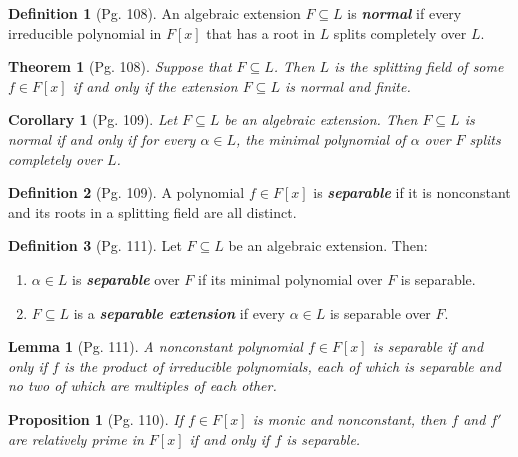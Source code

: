 \documentclass[leqno]{article}
\newtheorem{theorem}{Theorem}
\newtheorem{corollary}{Corollary}
\newtheorem{lemma}{Lemma}
\theoremstyle{definition}
\newtheorem{prop}{Proposition}
\newtheorem{definition}{Definition}
\theoremstyle{remark}
\theoremstyle{definition}
\begin{document}
    \begin{definition}[Pg. 108]\label{def:7}
        An algebraic extension $F\subseteq L$ is \textbf{\textit{normal}} if every irreducible polynomial in $F[x]$ that has a root in $L$ splits completely over $L$.
    \end{definition}
    \begin{theorem}[Pg. 108]\label{thm:5}
        Suppose that $F\subseteq L$. Then $L$ is the splitting field of some $f\in F[x]$ if and only if the extension $F\subseteq L$ is normal and finite.
    \end{theorem}
    \begin{corollary}[Pg. 109]\label{cor:2}
        Let $F\subseteq L$ be an algebraic extension. Then $F\subseteq L$ is normal if and only if for every $\alpha\in L$, the minimal polynomial of $\alpha$ over $F$ splits completely over $L$.
    \end{corollary}
    \begin{definition}[Pg. 109]\label{def:8}
        A polynomial $f\in F[x]$ is \textbf{\textit{separable}} if it is nonconstant and its roots in a splitting field are all distinct.
    \end{definition}
    \begin{definition}[Pg. 111]\label{def:9}
        Let $F\subseteq L$ be an algebraic extension. Then:
            \begin{enumerate}[label=\normalfont{(\alph*)}]
                \item $\alpha\in L$ is \textbf{\textit{separable}} over $F$ if its minimal polynomial over $F$ is separable.
                \item $F\subseteq L$ is a \textbf{\textit{separable extension}} if every $\alpha\in L$ is separable over $F$.
            \end{enumerate}
    \end{definition}
    \begin{lemma}[Pg. 111]\label{lem:10}
        A nonconstant polynomial $f\in F[x]$ is separable if and only if $f$ is the product of irreducible polynomials, each of which is separable and no two of which are multiples of each other. 
    \end{lemma}
    \begin{prop}[Pg. 110]\label{prop:3}
        \textit{If $f\in F[x]$ is monic and nonconstant, then $f$ and $f'$ are relatively prime in $F[x]$ if and only if $f$ is separable.}
    \end{prop}
\end{document}
